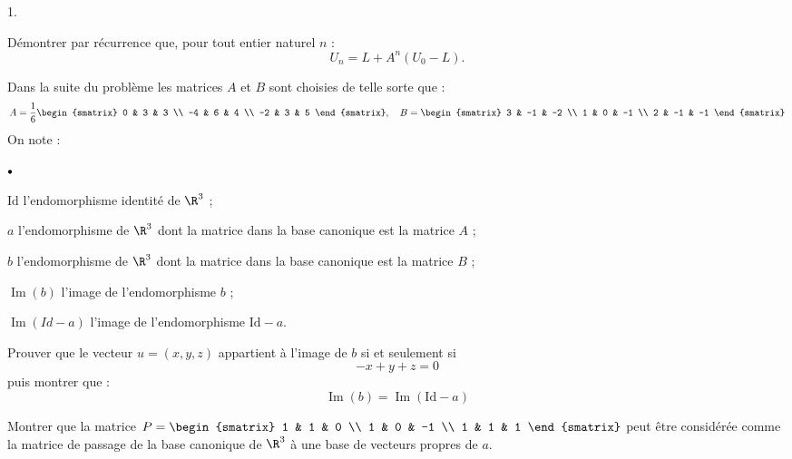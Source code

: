 \documentclass[11pt]{article}%
\begin{document}
\begin{noliste}{1.}
 \setlength{\itemsep}{4mm}
\item Démontrer par récurrence que, pour tout entier naturel $n$ :
\[
U_{n} = L + A^{n}\left( U_{0}-L\right).
\]

Dans la suite du problème les matrices $A$ et $B$ sont choisies de
telle
sorte que :
\[
A = \frac{1}{6}\begin{smatrix}
0 & 3 & 3 \\
-4 & 6 & 4 \\
-2 & 3 & 5
\end{smatrix},\quad B = 
\begin{smatrix}
3 & -1 & -2 \\
1 & 0 & -1 \\
2 & -1 & -1
\end{smatrix}
\]
On note :

\begin{noliste}{$\scriptstyle \bullet$}
\item $\mathrm{Id}$ l'endomorphisme identité de $\R^{3}$ ;

\item $a$ l'endomorphisme de $\R^{3}$ dont la matrice dans la base
canonique est la matrice $A$ ;

\item $b$ l'endomorphisme de $\R^{3}$ dont la matrice dans la base
canonique est la matrice $B$ ;

\item $\operatorname{Im}\left( b\right) $ l'image de l'endomorphisme
$b$ ;

\item $\operatorname{Im}\left( Id-a\right) $ l'image de l'endomorphisme
$\mathrm{Id}-a$.
\end{noliste}

\item Prouver que le vecteur $u = \left( x,y,z\right) $ appartient à
l'image de $b$ si et seulement si 
\[
-x + y + z = 0
\]
puis montrer que :
\[
\operatorname{Im}\left( b\right) = \operatorname{Im}\left(
\mathrm{Id}-a\right)
\]

\item Montrer que la matrice $P = 
\begin{smatrix}
1 & 1 & 0 \\
1 & 0 & -1 \\
1 & 1 & 1
\end{smatrix}
$ peut être considérée comme la matrice de passage de la base
canonique de $\R^{3}$ à une base de vecteurs propres de $a.$


\end{noliste}
\end{document}
